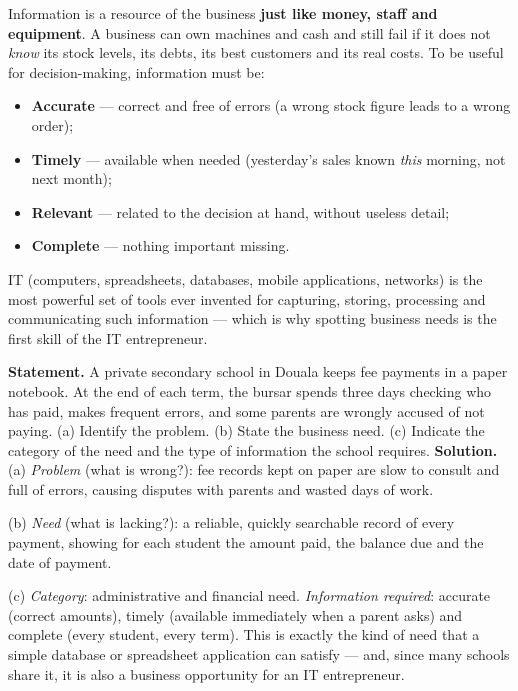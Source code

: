 \documentclass[11pt]{article}
\newcommand{\cle}[1]{{\popxbold\color{popdark}#1}}
\begin{document}
\begin{aretenir}
\cle{Information} is a resource of the business \textbf{just like money, staff and equipment}. A business can own machines and cash and still fail if it does not \emph{know} its stock levels, its debts, its best customers and its real costs. To be useful for decision-making, information must be:
\begin{itemize}
\item \textbf{Accurate} — correct and free of errors (a wrong stock figure leads to a wrong order);
\item \textbf{Timely} — available when needed (yesterday's sales known \emph{this} morning, not next month);
\item \textbf{Relevant} — related to the decision at hand, without useless detail;
\item \textbf{Complete} — nothing important missing.
\end{itemize}
IT (computers, spreadsheets, databases, mobile applications, networks) is the most powerful set of tools ever invented for capturing, storing, processing and communicating such information — which is why spotting business needs is the first skill of the IT entrepreneur.
\end{aretenir}

\begin{exoresolu}
\textbf{Statement.} A private secondary school in Douala keeps fee payments in a paper notebook. At the end of each term, the bursar spends three days checking who has paid, makes frequent errors, and some parents are wrongly accused of not paying. (a) Identify the problem. (b) State the business need. (c) Indicate the category of the need and the type of information the school requires.
\tcblower
\textbf{Solution.}
(a) \emph{Problem} (what is wrong?): fee records kept on paper are slow to consult and full of errors, causing disputes with parents and wasted days of work.

(b) \emph{Need} (what is lacking?): a reliable, quickly searchable record of every payment, showing for each student the amount paid, the balance due and the date of payment.

(c) \emph{Category}: administrative and financial need. \emph{Information required}: accurate (correct amounts), timely (available immediately when a parent asks) and complete (every student, every term). This is exactly the kind of need that a simple database or spreadsheet application can satisfy — and, since many schools share it, it is also a business opportunity for an IT entrepreneur.
\end{exoresolu}
\end{document}
